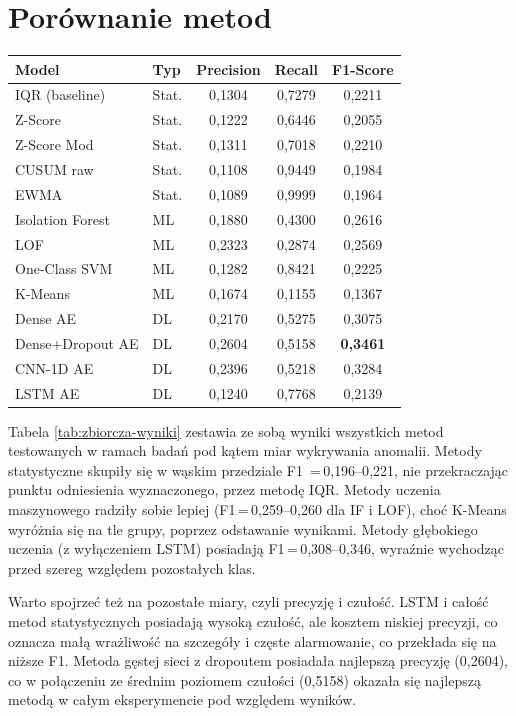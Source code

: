 \documentclass[a4paper,twoside,12pt]{book}
\begin{document}
	
	\section{Porównanie metod}
	
	\begin{tabular}{llccc}
		\toprule
		\label{tab:zbiorcza-wyniki}
		\textbf{Model} & \textbf{Typ} & \textbf{Precision} 
		& \textbf{Recall} & \textbf{F1-Score} \\
		\midrule
		IQR (baseline)    & Stat. & 0{,}1304 & 0{,}7279 & 0{,}2211 \\
		Z-Score           & Stat. & 0{,}1222 & 0{,}6446 & 0{,}2055 \\
		Z-Score Mod       & Stat. & 0{,}1311 & 0{,}7018 & 0{,}2210 \\
		CUSUM raw         & Stat. & 0{,}1108 & 0{,}9449 & 0{,}1984 \\
		EWMA              & Stat. & 0{,}1089 & 0{,}9999 & 0{,}1964 \\
		\midrule
		Isolation Forest  & ML   & 0{,}1880 & 0{,}4300 & 0{,}2616 \\
		LOF               & ML   & 0{,}2323 & 0{,}2874 & 0{,}2569 \\
		One-Class SVM     & ML   & 0{,}1282 & 0{,}8421 & 0{,}2225 \\
		K-Means           & ML   & 0{,}1674 & 0{,}1155 & 0{,}1367 \\
		\midrule
		Dense AE          & DL   & 0{,}2170 & 0{,}5275 & 0{,}3075 \\
		Dense+Dropout AE  & DL   & 0{,}2604 & 0{,}5158 & \textbf{0{,}3461} \\
		CNN-1D AE         & DL   & 0{,}2396 & 0{,}5218 & 0{,}3284 \\
		LSTM AE           & DL   & 0{,}1240 & 0{,}7768 & 0{,}2139 \\
		\bottomrule
	\end{tabular}
	
	Tabela \ref{tab:zbiorcza-wyniki} zestawia ze sobą wyniki wszystkich metod testowanych w ramach badań pod kątem miar wykrywania anomalii. Metody statystyczne skupiły się w wąskim przedziale F1 \,=\,0{,}196--0{,}221, nie przekraczając punktu odniesienia wyznaczonego, przez metodę IQR. Metody uczenia maszynowego radziły sobie lepiej (F1\,=\,0{,}259--0{,}260 dla IF i LOF), choć K-Means wyróżnia się na tle grupy, poprzez odstawanie wynikami. Metody głębokiego uczenia (z wyłączeniem LSTM) posiadają F1\,=\,0{,}308--0{,}346, wyraźnie wychodząc przed szereg względem pozostałych klas.
	
	Warto spojrzeć też na pozostałe miary, czyli precyzję i czułość. LSTM i całość metod statystycznych posiadają wysoką czułość, ale kosztem niskiej precyzji, co oznacza małą wrażliwość na szczegóły i częste alarmowanie, co przekłada się na niższe F1. Metoda gęstej sieci z dropoutem posiadała najlepszą precyzję (0{,}2604), co w połączeniu ze średnim poziomem czułości (0{,}5158) okazała się najlepszą metodą w całym eksperymencie pod względem wyników. 
	
\end{document}
